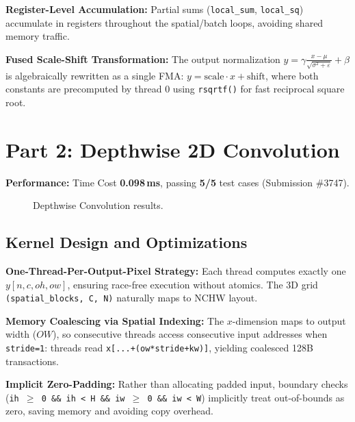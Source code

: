 \documentclass[11pt]{article}
\begin{document}
\textbf{Register-Level Accumulation:} Partial sums (\texttt{local\_sum}, \texttt{local\_sq}) accumulate in registers throughout the spatial/batch loops, avoiding shared memory traffic.

\textbf{Fused Scale-Shift Transformation:} The output normalization $y = \gamma \frac{x - \mu}{\sqrt{\sigma^2 + \varepsilon}} + \beta$ is algebraically rewritten as a single FMA: $y = \text{scale} \cdot x + \text{shift}$, where both constants are precomputed by thread 0 using \texttt{rsqrtf()} for fast reciprocal square root.

\section{Part 2: Depthwise 2D Convolution}

\textbf{Performance:} Time Cost \textbf{0.098\,ms}, passing \textbf{5/5} test cases (Submission \#3747).

\begin{figure}[H]
\centering
{}
\vspace{-0.2cm}
\caption{Depthwise Convolution results.}
\label{fig:dwc}
\end{figure}
\vspace{-0.4cm}

\subsection*{Kernel Design and Optimizations}

\textbf{One-Thread-Per-Output-Pixel Strategy:} Each thread computes exactly one $y[n,c,oh,ow]$, ensuring race-free execution without atomics. The 3D grid \texttt{(spatial\_blocks, C, N)} naturally maps to NCHW layout.

\textbf{Memory Coalescing via Spatial Indexing:} The $x$-dimension maps to output width ($OW$), so consecutive threads access consecutive input addresses when \texttt{stride=1}: threads read \texttt{x[...+(ow*stride+kw)]}, yielding coalesced 128B transactions.

\textbf{Implicit Zero-Padding:} Rather than allocating padded input, boundary checks (\texttt{ih $\geq$ 0 \&\& ih < H \&\& iw $\geq$ 0 \&\& iw < W}) implicitly treat out-of-bounds as zero, saving memory and avoiding copy overhead.
\end{document}
